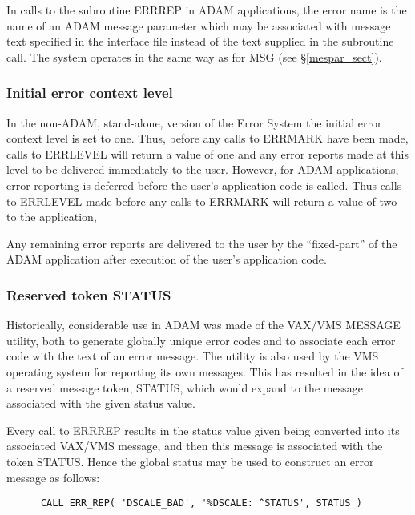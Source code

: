 \documentclass[twoside,11pt]{article}
\newcommand{\htmlref}[2]{#1}
\newcommand{\latex}[1]{#1}
\newcommand{\xlabel}[1]{}
\renewcommand{\_}{\texttt{\symbol{95}}}
\begin{document}
In calls to the subroutine ERR\_REP in ADAM applications, the error name is the
name of an ADAM message parameter which may be associated with message text
specified in the interface file instead of the text supplied in the subroutine
call.
The system operates in the same way as for
\htmlref{MSG}{mespar_sect}\latex{ (see \S\ref{mespar_sect})}.

\subsubsection{\xlabel{initial_error_context_level}Initial error context level}
In the non-ADAM, stand-alone, version of the Error System the initial error
context level is set to one.
Thus, before any calls to ERR\_MARK have been made, calls to ERR\_LEVEL will
return a value of one and any error reports made at this level to be delivered
immediately to the user.
However, for ADAM applications, error reporting is deferred before
the user's application code is called.
Thus calls to ERR\_LEVEL made before any calls to ERR\_MARK will return a
value of two to the application,

Any remaining error reports are delivered to the user by the ``fixed-part''
of the ADAM application after execution of
the user's application code.


\subsubsection{\xlabel{reserved_token_status}Reserved token STATUS \label{restok}}
Historically, considerable use in ADAM was made of the VAX/VMS MESSAGE utility,
both to generate globally unique error codes and to associate each error code
with the text of an error message.
The utility is also used by the VMS operating system for reporting
its own messages.
This has resulted in the idea of
a reserved message token, STATUS, which would expand to the message associated
with the given status value.

Every call to ERR\_REP results in the status value given being converted into
its associated VAX/VMS message, and then this message is associated with the
token STATUS.
Hence the global status may be used to construct an error message as follows:

\begin {small}
\begin{verbatim}
      CALL ERR_REP( 'DSCALE_BAD', '%DSCALE: ^STATUS', STATUS )
\end{verbatim}
\end {small}
\end{document}
